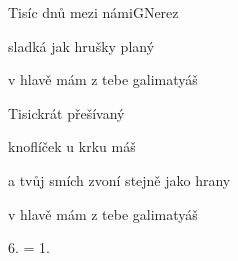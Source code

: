\begin{song}{Tisíc dnů mezi námi}{G}{Nerez}
\begin{SBVerse}
sladká jak hrušky planý

v hlavě mám z tebe galimatyáš

\end{SBVerse}

\begin{SBVerse}

Tisickrát přešívaný

knoflíček u krku máš

a tvůj smích zvoní stejně jako hrany

v hlavě mám z tebe galimatyáš

\end{SBVerse}

6. = 1.

\begin{SBChorus}

\end{SBChorus}

\end{song}

\clearpage